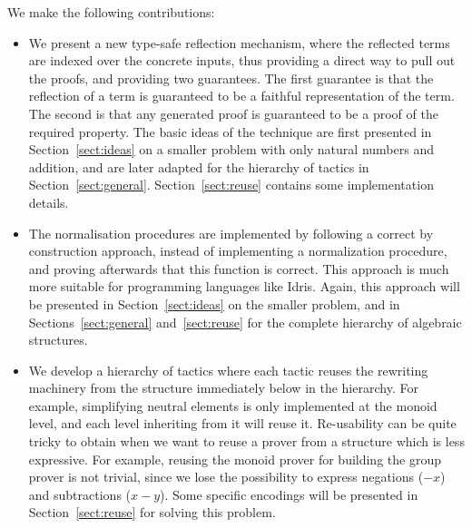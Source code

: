 We make the following contributions:

\begin{itemize}
        \item We present a new type-safe reflection mechanism, where the
        reflected terms are indexed over the concrete inputs, thus providing a
        direct way to pull out the proofs, and providing two guarantees.
        The first guarantee is that the reflection of a term is guaranteed to be a
        faithful representation of the term. The second is that any generated
        proof is guaranteed to be a proof of the required property. The basic
        ideas of the technique are first presented in Section~\ref{sect:ideas} on a
        smaller problem with only natural numbers and addition, and are later
        adapted for the hierarchy of tactics in Section~\ref{sect:general}. 
        Section~\ref{sect:reuse} contains some implementation details.	

        \item The normalisation procedures are implemented by following a
        correct by construction approach, instead of implementing a
        normalization procedure, and proving afterwards that this function
        is correct. This approach is much more suitable
        for programming languages like Idris. Again, this approach will be
        presented in Section~\ref{sect:ideas} on the smaller problem, 
        and in Sections~\ref{sect:general} and~\ref{sect:reuse}
        for the complete hierarchy of algebraic structures.

        \item We develop a hierarchy of tactics where each tactic reuses the
        rewriting machinery from the structure immediately below in the hierarchy.
        For example,
        simplifying neutral elements is only implemented at the monoid level,
        and each level inheriting from it will reuse it. Re-usability can be quite tricky
        to obtain when we want to reuse a prover from a structure which is less
        expressive. For example, reusing the monoid prover for building the
        group prover is not trivial, since we lose the possibility to express
        negations ($-x$) and subtractions ($x-y$). Some specific encodings
        will be presented in Section~\ref{sect:reuse} for solving this problem.

\end{itemize}
